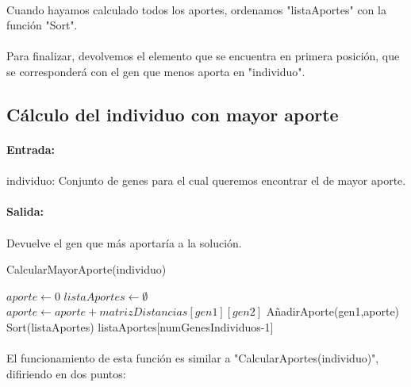 	\paragraph{}Cuando hayamos calculado todos los aportes, ordenamos "listaAportes" con la función "Sort".
	
	\paragraph{}Para finalizar, devolvemos el elemento que se encuentra en primera posición, que se corresponderá con el gen que menos aporta en "individuo".
	
	\subsection{Cálculo del individuo con mayor aporte}
	
	\paragraph{Entrada:}
	
	\paragraph{}individuo: Conjunto de genes para el cual queremos encontrar el de mayor aporte.
	
	\paragraph{Salida:}
	
	\paragraph{}Devuelve el gen que más aportaría a la solución.
	
	\begin{algorithm}[H]
		\caption{CalcularMayorAporte(individuo)}
		\begin{algorithmic}
			\STATE $aporte \leftarrow 0$
			\STATE $listaAportes \leftarrow \emptyset$
			\STATE $aporte \leftarrow aporte + matrizDistancias[gen1][gen2]$
			\ENDFOR
			\STATE AñadirAporte(gen1,aporte)
			\ENDFOR
			\STATE Sort(listaAportes)
			\RETURN listaAportes[numGenesIndividuos-1]	
		\end{algorithmic}
	\end{algorithm}

	\paragraph{}El funcionamiento de esta función es similar a "CalcularAportes(individuo)", difiriendo en dos puntos:
	
